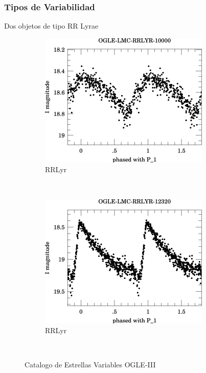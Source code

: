 \documentclass{beamer}
\begin{document}
\begin{frame}
  \frametitle{Tipos de Variabilidad}
  Dos objetos de tipo RR Lyrae
  \begin{figure}
    \centering
    \begin{subfigure}[b]{0.4\textwidth}
      \includegraphics[width=\textwidth]{./img/OGLE-LMC-RRLYR-10000_1.jpg}
      \caption{RRLyr}
      \label{fig:gull}
    \end{subfigure}%
    ~ %
    \begin{subfigure}[b]{0.4\textwidth}
      \includegraphics[width=\textwidth]{./img/OGLE-LMC-RRLYR-12320_1.jpg}
      \caption{RRLyr}
      \label{fig:tiger}
    \end{subfigure}
    ~ %
    \caption{Catalogo de Estrellas Variables OGLE-III}\label{fig:animals}
  \end{figure}
\end{frame}
\end{document}
